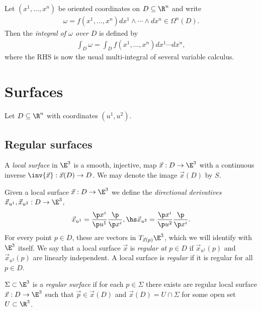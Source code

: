 \documentclass{article}
\begin{document}
\begin{definition}
	Let $(x^1,...,x^n)$ be oriented coordinates on $D\subseteq \R^n$ and write
	\begin{align*}
		\omega = f(x^1, ..., x^n)dx^1\wedge\cdots\wedge dx^n\in\Omega^n(D).
	\end{align*}
	Then the \emph{integral of $\omega$ over $D$} is defined by
	\begin{align*}
		\int_D \omega = \int_D f(x^1,...,x^n)dx^1\cdots dx^n,
	\end{align*}
	where the RHS is now the usual multi-integral of several variable calculus.
\end{definition}

\section{Surfaces}

Let $D\subseteq\R^n$ with coordinates $(u^1,u^2)$.

\subsection{Regular surfaces}

\begin{definition}
	A \emph{local surface} in $\E^3$ is a smooth, injective, map $\vec x: D\to\E^3$
	with a continuous inverse $\inv{\vec x} : \vec x(D) \to D$. We may denote the image
	$\vec x (D)$ by $S$.
\end{definition}

\begin{definition}
	Given a local surface $\vec x:D\to\E^3$ we define the \emph{directional derivatives}
	$\vec x_{u^1},\vec x_{u^2}:D\to\E^3$,
	\begin{align*}
		\vec x_{u^1} = \frac{\p x^i}{\p u^1}\frac{\p}{\p x^i}, \hs
		\vec x_{u^2} = \frac{\p x^i}{\p u^2}\frac{\p}{\p x^i}.
	\end{align*}
	For every point $p\in D$, these are vectors in $T_{\vec x(p)}\E^3$, which we will
	identify with $\E^3$ itself. We say that a local surface $\vec x$ is \emph{regular
		at $p\in D$} if $\vec x_{u^1}(p)$ and $\vec x_{u^2}(p)$ are linearly independent.
	A local surface is \emph{regular} if it is regular for all $p\in D$.
\end{definition}

\begin{definition}
	$\Sigma\subset\E^3$ is a \emph{regular surface} if for each $p\in\Sigma$ there
	exists are regular local surface $\vec x:D\to\E^3$ such that $\vec p\in\vec x(D)$
	and $\vec x(D)=U\cap\Sigma$ for some open set $U\subset\R^3$.
\end{definition}
\end{document}
